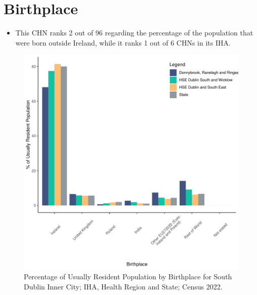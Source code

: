 \documentclass{article}
\begin{document}
\section{Birthplace}\label{sect:Birth}
\begin{itemize}
\item This CHN ranks  2 out of 96 regarding the percentage of the population that were born outside Ireland, while it ranks  1 out of 6 CHNs in its IHA.
\end{itemize}
\begin{figure}[H]
	\centering
	\includegraphics[width = 130mm]{../figures/BirthED.pdf}
	\caption{Percentage of Usually Resident Population by Birthplace for South Dublin Inner City; IHA, Health Region and State; Census 2022.}
	\label{fig:vbnv}
	\end{figure}
	
\end{document}
